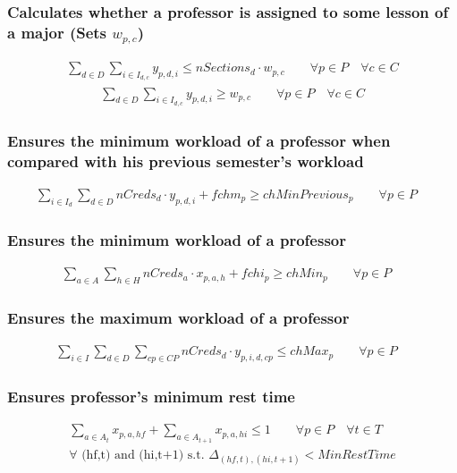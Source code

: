 \subsubsection{Calculates whether a professor is assigned to some lesson of a major (Sets $w_{p,c}$)}
\begin{eqnarray}
\sum\limits_{d \in D} \sum\limits_{i \in I_{d,c}} y_{p,d,i} \le nSections_{d} \cdot w_{p,c} \nonumber \qquad 
\forall p \in P \quad
\forall c \in C
\end{eqnarray}
\begin{eqnarray}
\sum\limits_{d \in D} \sum\limits_{i \in I_{d,c}} y_{p,d,i} \ge w_{p,c} \nonumber \qquad 
\forall p \in P \quad
\forall c \in C
\end{eqnarray}

\subsubsection{Ensures the minimum workload of a professor when compared with his previous semester's workload}
\begin{eqnarray}
\sum\limits_{i \in I_{d}}\sum\limits_{d \in D} nCreds_{d} \cdot y_{p,d,i} + fchm_{p} \ge chMinPrevious_{p} \nonumber \qquad 
\forall p \in P \quad
\end{eqnarray}

\subsubsection{Ensures the minimum workload of a professor}
\begin{eqnarray}
\sum\limits_{a \in A}\sum\limits_{h \in H} nCreds_{a} \cdot x_{p,a,h} + fchi_{p} \ge chMin_{p} \nonumber \qquad 
\forall p \in P \quad
\end{eqnarray}

\subsubsection{Ensures the maximum workload of a professor}
\begin{eqnarray}
\sum\limits_{i \in I}\sum\limits_{d \in D}\sum\limits_{cp \in CP} nCreds_{d} \cdot y_{p,i,d,cp} \le chMax_{p} \nonumber \qquad 
\forall p \in P \quad
\end{eqnarray}

\subsubsection{Ensures professor's minimum rest time}
\begin{eqnarray}
\sum\limits_{a \in A_{t}} x_{p,a,hf} + \sum\limits_{a \in A_{t+1}} x_{p,a,hi} \le 1 \nonumber \qquad 
\forall p \in P \quad
\forall t \in T \\
\forall \mbox{ (hf,t) and (hi,t+1) s.t. } \Delta_{(hf,t), (hi,t+1)} < MinRestTime
\end{eqnarray}

